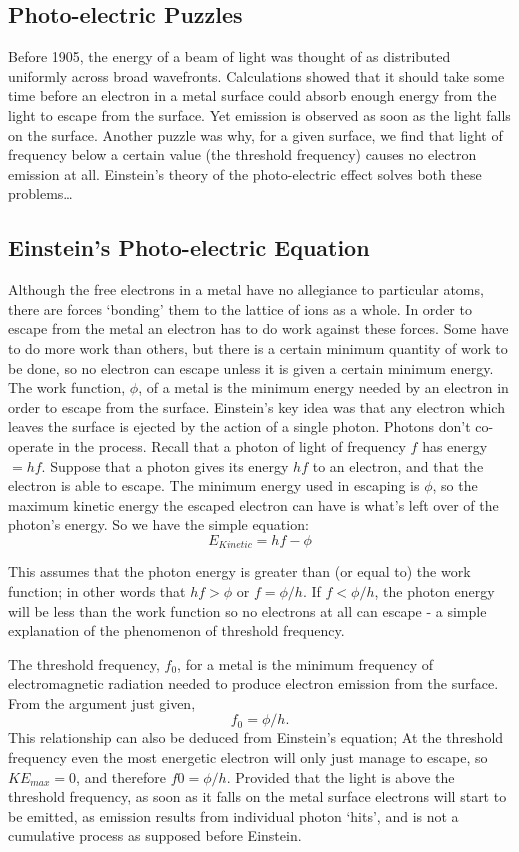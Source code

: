 \subsection{Photo-electric Puzzles}
Before 1905, the energy of a beam of light was thought of as distributed uniformly across broad wavefronts. Calculations showed that it should take some time before an electron in a metal surface could absorb enough energy from the light to escape from the surface. Yet emission is observed as soon as the light falls on the surface.
Another puzzle was why, for a given surface, we find that light of frequency below a certain value (the threshold frequency) causes no electron emission at all.
Einstein's theory of the photo-electric effect solves both these problems\ldots

\subsection{Einstein's Photo-electric Equation}
Although the free electrons in a metal have no allegiance to particular atoms, there are forces `bonding' them to the lattice of ions as a whole. In order to escape from the metal an electron has to do work against these forces. Some have to do more work than others, but there is a certain minimum quantity of work to be done, so no electron can escape unless it is given a certain minimum energy.
The work function, $\phi$, of a metal is the minimum energy needed by an electron in order to escape from the surface. 
Einstein's key idea was that any electron which leaves the surface is ejected by the action of a single photon. Photons don't co-operate in the process.
Recall that a photon of light of frequency $f$ has energy $= hf$. 
Suppose that a photon gives its energy $hf$ to an electron, and that the electron is able to escape. The minimum energy used in escaping is $\phi$, so the maximum kinetic energy the escaped electron can have is what's left over of the photon's energy. So we have the simple equation:
\[ E_{Kinetic} =hf - \phi \]


This assumes that the photon energy is greater than (or equal to) the work function; in other words that  $hf>\phi$ or $f=\phi/h$.
If  $f < \phi/h$, the photon energy will be less than the work function so no electrons at all can escape - a simple explanation of the phenomenon of threshold frequency.
 
The threshold frequency, $f_0$, for a metal is the minimum frequency of electromagnetic radiation needed to produce electron emission from the surface.
From the argument just given, 
\[f_{0} =  \phi/ h.\]
This relationship can also be deduced from Einstein's equation; At the threshold frequency even the most energetic electron will only just manage to escape, so $KE_{max} =  0$, and therefore     $f0 = \phi/h$.
Provided that the light is above the threshold frequency, as soon as it falls on the metal surface electrons will start to be emitted, as emission results from individual photon `hits', and is not a cumulative process as supposed before Einstein.

